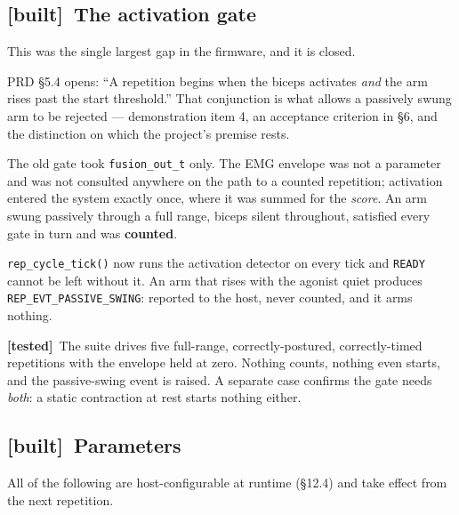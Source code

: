\documentclass[11pt]{article}
\newcommand{\built}{{\sffamily\scriptsize\color{good}\textbf{[built]}}\ }
\newcommand{\tested}{{\sffamily\scriptsize\color{annot}\textbf{[tested]}}\ }
\begin{document}
\subsection{\built The activation gate}
\label{sec:gate}

\begin{callout}
This was the single largest gap in the firmware, and it is closed.

\medskip
PRD \S5.4 opens: ``A repetition begins when the biceps activates \emph{and}
the arm rises past the start threshold.'' That conjunction is what allows a
passively swung arm to be rejected --- demonstration item 4, an acceptance
criterion in \S6, and the distinction on which the project's premise rests.

\medskip
The old gate took \texttt{fusion\_out\_t} only. The EMG envelope was not a
parameter and was not consulted anywhere on the path to a counted repetition;
activation entered the system exactly once, where it was summed for the
\emph{score}. An arm swung passively through a full range, biceps silent
throughout, satisfied every gate in turn and was \textbf{counted}.

\medskip
\texttt{rep\_cycle\_tick()} now runs the activation detector on every tick and
\texttt{READY} cannot be left without it. An arm that rises with the agonist
quiet produces \texttt{REP\_EVT\_PASSIVE\_SWING}: reported to the host, never
counted, and it arms nothing.

\medskip
\tested The suite drives five full-range, correctly-postured, correctly-timed
repetitions with the envelope held at zero. Nothing counts, nothing even
starts, and the passive-swing event is raised. A separate case confirms the
gate needs \emph{both}: a static contraction at rest starts nothing either.
\end{callout}

\subsection{\built Parameters}

All of the following are host-configurable at runtime (\S12.4) and take effect
from the next repetition.
\end{document}
